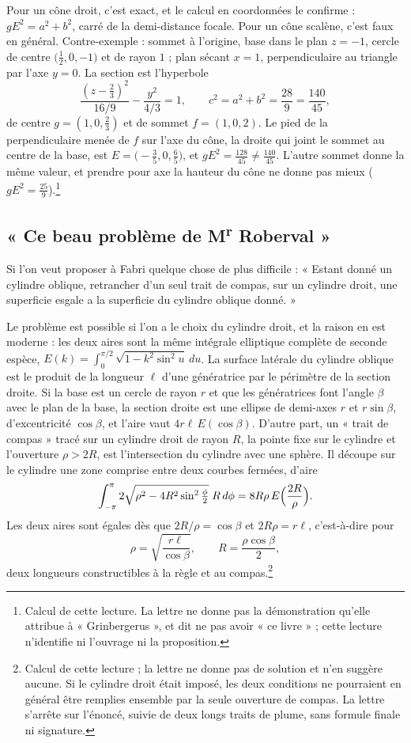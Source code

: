 \documentclass[11pt,a4paper]{article}
\begin{document}
Pour un cône droit, c'est exact, et le calcul en coordonnées le confirme :
\(gE^2=a^2+b^2\), carré de la demi-distance focale. Pour un cône scalène, c'est
faux en général. Contre-exemple : sommet à l'origine, base dans le plan
\(z=-1\), cercle de centre \(\bigl(\tfrac12,0,-1\bigr)\) et de rayon \(1\) ;
plan sécant \(x=1\), perpendiculaire au triangle par l'axe \(y=0\). La section
est l'hyperbole
\[
\frac{(z-\tfrac23)^2}{16/9}-\frac{y^2}{4/3}=1,
\qquad c^2=a^2+b^2=\frac{28}{9}=\frac{140}{45},
\]
de centre \(g=(1,0,\tfrac23)\) et de sommet \(f=(1,0,2)\). Le pied de la
perpendiculaire menée de \(f\) sur l'axe du cône, la droite qui joint le sommet
au centre de la base, est \(E=\bigl(-\tfrac35,0,\tfrac65\bigr)\), et
\(gE^2=\tfrac{128}{45}\neq\tfrac{140}{45}\). L'autre sommet donne la même
valeur, et prendre pour axe la hauteur du cône ne donne pas mieux
(\(gE^2=\tfrac{25}{9}\)).\footnote{Calcul de cette lecture. La lettre ne donne
pas la démonstration qu'elle attribue à « Grinbergerus », et dit ne pas avoir
« ce livre » ; cette lecture n'identifie ni l'ouvrage ni la proposition.}

\subsection*{« Ce beau problème de M\textsuperscript{r} Roberval »}

Si l'on veut proposer à Fabri quelque chose de plus difficile : « Estant donné
un cylindre oblique, retrancher d'un seul trait de compas, sur un cylindre
droit, une superficie esgale a la superficie du cylindre oblique donné. »

Le problème est possible si l'on a le choix du cylindre droit, et la raison en
est moderne : les deux aires sont la même intégrale elliptique complète de
seconde espèce, \(E(k)=\int_0^{\pi/2}\sqrt{1-k^2\sin^2u}\,du\). La surface
latérale du cylindre oblique est le produit de la longueur \(\ell\) d'une
génératrice par le périmètre de la section droite. Si la base est un cercle de
rayon \(r\) et que les génératrices font l'angle \(\beta\) avec le plan de la
base, la section droite est une ellipse de demi-axes \(r\) et \(r\sin\beta\),
d'excentricité \(\cos\beta\), et l'aire vaut \(4r\ell\,E(\cos\beta)\). D'autre
part, un « trait de compas » tracé sur un cylindre droit de rayon \(R\), la
pointe fixe sur le cylindre et l'ouverture \(\rho>2R\), est l'intersection du
cylindre avec une sphère. Il découpe sur le cylindre une zone comprise entre
deux courbes fermées, d'aire
\[
\int_{-\pi}^{\pi}2\sqrt{\rho^2-4R^2\sin^2\tfrac{\phi}{2}}\;R\,d\phi
=8R\rho\,E\Bigl(\frac{2R}{\rho}\Bigr).
\]
Les deux aires sont égales dès que \(2R/\rho=\cos\beta\) et \(2R\rho=r\ell\),
c'est-à-dire pour
\[
\rho=\sqrt{\frac{r\ell}{\cos\beta}},\qquad R=\frac{\rho\cos\beta}{2},
\]
deux longueurs constructibles à la règle et au compas.\footnote{Calcul de
cette lecture ; la lettre ne donne pas de solution et n'en suggère aucune. Si
le cylindre droit était imposé, les deux conditions ne pourraient en général
être remplies ensemble par la seule ouverture de compas. La lettre s'arrête sur
l'énoncé, suivie de deux longs traits de plume, sans formule finale ni
signature.}
\end{document}
